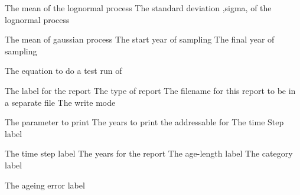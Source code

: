  {The mean of the lognormal process}
 {The standard deviation ,sigma, of the lognormal process}
\par\textbf{}\par
{} {The mean of gaussian process}
 {The start year of sampling}
 {The final year of sampling}
\par\textbf{}\par
{} {The equation to do a test run of}
\par\par
{} {The label for the report}
 {The type of report}
 {The filename for this report to be in a separate file}
 {The write mode}
\par\textbf{}\par
{} {The parameter to print}
 {The years to print the addressable for}
 {The time Step label}
\par\textbf{}\par
{} {The time step label}
 {The years for the report}
 {The age-length label}
 {The category label}
\par\textbf{}\par
{} {The ageing error label}
\par\textbf{}\par
\par\textbf{}\par
\par\textbf{}\par
\par\textbf{}\par
\par\textbf{}\par
\par\textbf{}\par
